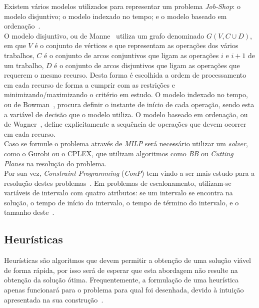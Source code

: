 Existem vários modelos utilizados para representar um problema \textit{Job-Shop}: o modelo disjuntivo; o modelo indexado no tempo; e o modelo baseado em ordenação~\cite{kuMixedIntegerProgramming2016}.\\

O modelo disjuntivo, ou de Manne~\cite{manneJobShopSchedulingProblem1960} utiliza um grafo denominado $G(V,C \cup D)$, em que $V$ é o conjunto de vértices e que representam as operações dos vários trabalhos, $C$ é o conjunto de arcos conjuntivos que ligam as operações $i$ e $i+1$ de um trabalho, $D$ é o conjunto de arcos disjuntivos que ligam as operações que requerem o mesmo recurso. Desta forma é escolhida a ordem de processamento em cada recurso de forma a cumprir com as restrições e minimizando/maximizando o critério em estudo. O modelo indexado no tempo, ou de Bowman~\cite{bowmanScheduleSequencingProblem1959}, procura definir o instante de início de cada operação, sendo esta a variável de decisão que o modelo utiliza. O modelo baseado em ordenação, ou de Wagner~\cite{wagnerIntegerLinearprogrammingModel1959}, define explicitamente a sequência de operações que devem ocorrer em cada recurso.\\

Caso se formule o problema através de \textit{MILP} será necessário utilizar um \textit{solver}, como o Gurobi ou o CPLEX, que utilizam algoritmos como \textit{BB} ou \textit{Cutting Planes} na resolução do problema. \\

Por sua vez, \textit{Constraint Programming} (\textit{ConP}) tem vindo a ser mais estudo para a resolução destes problemas~\cite{dauzere-peresFlexibleJobShop2024}. Em problemas de escalonamento, utilizam-se variáveis de intervalo com quatro atributos: se um intervalo se encontra na solução, o tempo de início do intervalo, o tempo de término do intervalo, e o tamanho deste~\cite{kasapidisFlexibleJobShop2021}.\\

\subsection{Heurísticas}

Heurísticas são algoritmos que devem permitir a obtenção de uma solução viável de forma rápida, por isso será de esperar que esta abordagem não resulte na obtenção da solução ótima. Frequentemente, a formulação de uma heurística apenas funcionará para o problema para qual foi desenhada, devido à intuição apresentada na sua construção~\cite{ezugwuMetaheuristicsComprehensiveOverview2021}.\\

